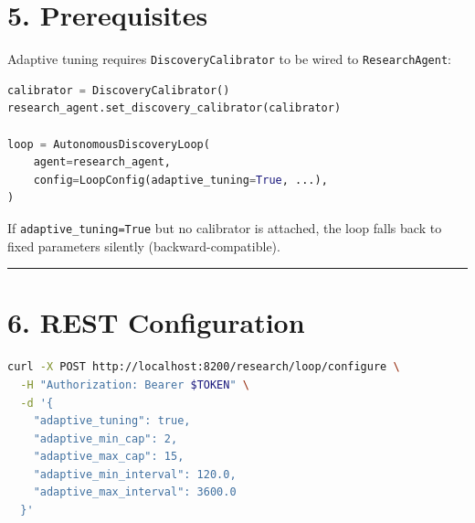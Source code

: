 \section*{5. Prerequisites}

Adaptive tuning requires \texttt{DiscoveryCalibrator} to be wired to \texttt{ResearchAgent}:

\begin{lstlisting}[language=Python]
calibrator = DiscoveryCalibrator()
research_agent.set_discovery_calibrator(calibrator)

loop = AutonomousDiscoveryLoop(
    agent=research_agent,
    config=LoopConfig(adaptive_tuning=True, ...),
)
\end{lstlisting}

If \texttt{adaptive\_tuning=True} but no calibrator is attached, the loop falls back to fixed parameters silently (backward-compatible).

\medskip\noindent\rule{\linewidth}{0.4pt}\medskip

\section*{6. REST Configuration}

\begin{lstlisting}[language=Bash]
curl -X POST http://localhost:8200/research/loop/configure \
  -H "Authorization: Bearer $TOKEN" \
  -d '{
    "adaptive_tuning": true,
    "adaptive_min_cap": 2,
    "adaptive_max_cap": 15,
    "adaptive_min_interval": 120.0,
    "adaptive_max_interval": 3600.0
  }'
\end{lstlisting}